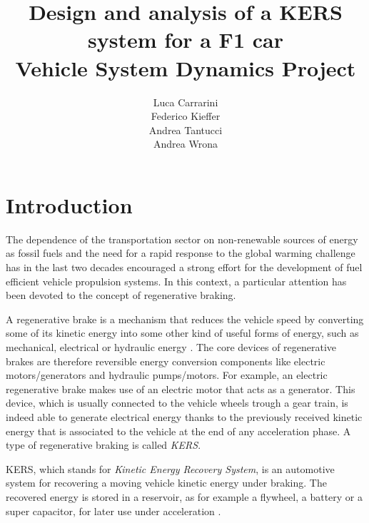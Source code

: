 \documentclass[11pt]{article}
\begin{document}
\title{\textcolor{sapred}{Design and analysis of a KERS system for a F1 car}\\\small{Vehicle System Dynamics Project}}
\author{Luca Carrarini\\Federico Kieffer\\Andrea Tantucci\\Andrea Wrona}
\maketitle

\thispagestyle{empty}

\tableofcontents
\newpage

\section{Introduction}

The dependence of the transportation sector on non-renewable sources of energy as fossil fuels and the need for a rapid response to the global warming challenge has in the last two decades encouraged a strong effort for the development of fuel efficient vehicle propulsion systems. In this context, a particular attention has been devoted to the concept of regenerative braking. 

A regenerative brake is a mechanism that reduces the vehicle speed by converting some of its kinetic energy into some other kind of useful forms of energy, such as mechanical, electrical or hydraulic energy \cite{a}. The core devices of regenerative brakes are therefore reversible energy conversion components like electric motors/generators and hydraulic pumps/motors. For example, an electric regenerative brake makes use of an electric motor that acts as a generator. This device, which is usually connected to the vehicle wheels trough a gear train, is indeed able to generate electrical energy thanks to the previously received kinetic energy that is associated to the vehicle at the end of any acceleration phase. 
A type of regenerative braking is called \textit{KERS}. 

KERS, which stands for \textit{Kinetic Energy Recovery System}, is an automotive system for recovering a moving vehicle kinetic energy under braking. The recovered energy is stored in a reservoir, as for example a flywheel, a battery or a super capacitor, for later use under acceleration \cite{b}. 
\end{document}
